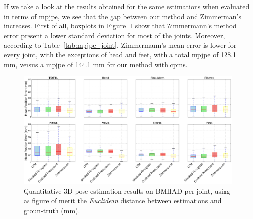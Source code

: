 If we take a look at the results obtained for the same estimations when evaluated in terms of \gls{mpjpe}, we see that the gap between our method and Zimmerman's increases. First of all, boxplots in Figure~\ref{fig:mpjpe} show that Zimmermann's method error present a lower standard deviation for most of the joints. Moreover, according to Table~\ref{tab:mpjpe_joint}, Zimmermann's mean error is lower for every joint, with the exceptions of head and feet, with a total \gls{mpjpe} of 128.1 mm, versus a \gls{mpjpe} of 144.1 mm for our method with \glspl{cpm}. 

\begin{figure}[h]
    \centering
    \includegraphics[width=\textwidth]{figures/mpjpe.png}
    \caption{Quantitative 3D pose estimation results on BMHAD per joint, using as figure of merit the \emph{Euclidean} distance between estimations and groun-truth (mm).}
    \label{fig:mpjpe}
\end{figure}

\begin{table}[!ht]  
  \centering
  \caption{Quantitative 3D pose estimation results on BMHAD per joint, using as figure of merit MPJPE (mm). Values in bold correspond to the best results achieved for each category.}
  \label{tab:mpjpe_joint}
\end{table}

